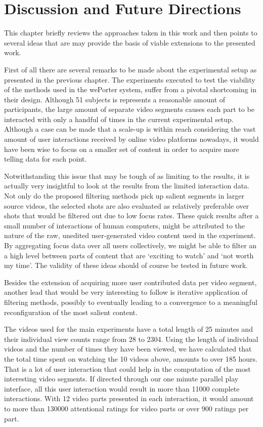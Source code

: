 \chapter{Discussion and Future Directions}
\label{ch:discussion}

This chapter briefly reviews the approaches taken in this work and then points to several ideas that are may provide the basis of viable extensions to the presented work.

First of all there are several remarks to be made about the experimental setup as presented in the previous chapter. The experiments executed to test the viability of the methods used in the wePorter system, suffer from a pivotal shortcoming in their design. Although 51 subjects is represents a reasonable amount of participants, the large amount of separate video segments causes each part to be interacted with only a handful of times in the current experimental setup. Although a case can be made that a scale-up is within reach considering the vast amount of user interactions received by online video platforms nowadays, it would have been wise to focus on a smaller set of content in order to acquire more telling data for each point.

Notwithstanding this issue that may be tough of as limiting to the results, it is actually very insightful to look at the results from the limited interaction data. Not only do the proposed filtering methods pick up salient segments in larger source videos, the selected shots are also evaluated as relatively preferable over shots that would be filtered out due to low focus rates. These quick results after a small number of interactions of human computers, might be attributed to the nature of the raw, unedited user-generated video content used in the experiment. By aggregating focus data over all users collectively, we might be able to filter an a high level between parts of content that are `exciting to watch' and `not worth my time'. The validity of these ideas should of course be tested in future work. 

Besides the extension of acquiring more user contributed data per video segment, another lead that would be very interesting to follow is iterative application of filtering methods, possibly to eventually leading to a convergence to a meaningful reconfiguration of the most salient content.

The videos used for the main experiments have a total length of 25 minutes and their individual view counts range from 28 to 2304. Using the length of individual videos and the number of times they have been viewed, we have calculated that the total time spent on watching the 10 videos above, amounts to over 185 hours. That is a lot of user interaction that could help in the computation of the most interesting video segments. If directed through our one minute parallel play interface, all this user interaction would result in more than 11000 complete interactions. With 12 video parts presented in each interaction, it would amount to more than 130000 attentional ratings for video parts or over 900 ratings per part. 

